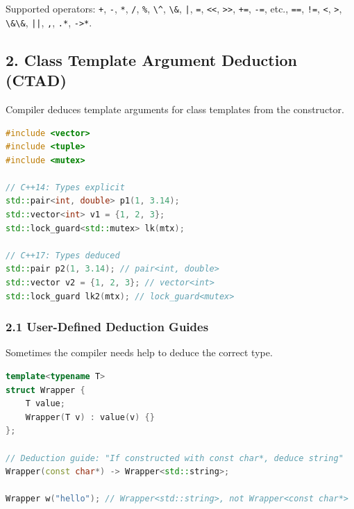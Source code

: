 Supported operators: \passthrough{\lstinline!+!},
\passthrough{\lstinline!-!}, \passthrough{\lstinline!*!},
\passthrough{\lstinline!/!}, \passthrough{\lstinline!\%!},
\passthrough{\lstinline!\^!}, \passthrough{\lstinline!\&!},
\passthrough{\lstinline!|!}, \passthrough{\lstinline!=!},
\passthrough{\lstinline!<<!}, \passthrough{\lstinline!>>!},
\passthrough{\lstinline!+=!}, \passthrough{\lstinline!-=!}, etc.,
\passthrough{\lstinline!==!}, \passthrough{\lstinline"!="},
\passthrough{\lstinline!<!}, \passthrough{\lstinline!>!},
\passthrough{\lstinline!\&\&!}, \passthrough{\lstinline!||!},
\passthrough{\lstinline!,!}, \passthrough{\lstinline!.*!},
\passthrough{\lstinline!->*!}.

\hypertarget{class-template-argument-deduction-ctad}{%
\subsection{2. Class Template Argument Deduction
(CTAD)}\label{class-template-argument-deduction-ctad}}

Compiler deduces template arguments for class templates from the
constructor.

\begin{lstlisting}[language={C++}]
#include <vector>
#include <tuple>
#include <mutex>

// C++14: Types explicit
std::pair<int, double> p1(1, 3.14);
std::vector<int> v1 = {1, 2, 3};
std::lock_guard<std::mutex> lk(mtx);

// C++17: Types deduced
std::pair p2(1, 3.14); // pair<int, double>
std::vector v2 = {1, 2, 3}; // vector<int>
std::lock_guard lk2(mtx); // lock_guard<mutex>
\end{lstlisting}

\hypertarget{user-defined-deduction-guides}{%
\subsubsection{2.1 User-Defined Deduction
Guides}\label{user-defined-deduction-guides}}

Sometimes the compiler needs help to deduce the correct type.

\begin{lstlisting}[language={C++}]
template<typename T>
struct Wrapper {
    T value;
    Wrapper(T v) : value(v) {}
};

// Deduction guide: "If constructed with const char*, deduce string"
Wrapper(const char*) -> Wrapper<std::string>;

Wrapper w("hello"); // Wrapper<std::string>, not Wrapper<const char*>
\end{lstlisting}

